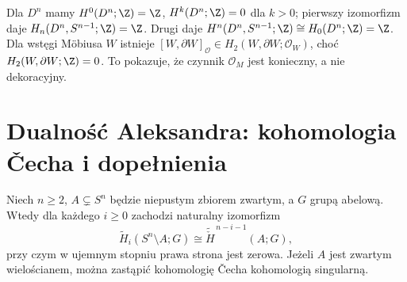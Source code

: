 
\begin{przyklad}
Dla $D^n$ mamy
$H^0(D^n;\Z)=\Z$, $H^k(D^n;\Z)=0$ dla $k>0$;
pierwszy izomorfizm daje
$H_n(D^n,S^{n-1};\Z)=\Z$. Drugi daje
$H^n(D^n,S^{n-1};\Z)\cong H_0(D^n;\Z)=\Z$.
Dla wstęgi Möbiusa $W$ istnieje
$[W,\partial W]_{\mathcal O}\in H_2(W,\partial W;\mathcal O_W)$,
choć $H_2(W,\partial W;\Z)=0$. To pokazuje, że czynnik
$\mathcal O_M$ jest konieczny, a nie dekoracyjny.
\end{przyklad}

\section{Dualność Aleksandra: kohomologia \v{C}echa i dopełnienia}
\label{sec:alexander-v4}
\begin{twierdzenie}
\label{thm:alexander-v4}
Niech $n\ge2$, $A\subsetneq S^n$ będzie niepustym zbiorem
zwartym, a $G$ grupą abelową. Wtedy dla każdego $i\ge0$
zachodzi naturalny izomorfizm
\[
\widetilde H_i(S^n\setminus A;G)
\cong\widetilde{\check H}^{\,n-i-1}(A;G),
\]
przy czym w ujemnym stopniu prawa strona jest zerowa.
Jeżeli $A$ jest zwartym wielościanem, można zastąpić
kohomologię \v{C}echa kohomologią singularną.
\end{twierdzenie}
